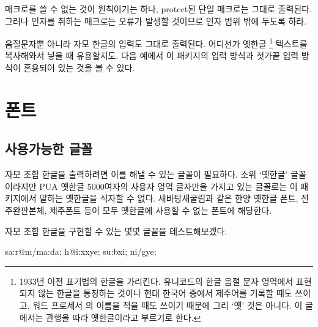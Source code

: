 \documentclass[a4paper]{oblivoir}
\let\cmda\cmd
\begin{document}
\medskip
\begin{exampleside}
\end{exampleside}

매크로를 쓸 수 없는 것이 원칙이기는 하나,
protect된 단일 매크로는 그대로 출력된다. 그러나 인자를 취하는 매크로는 오류가 발생할 것이므로 
인자 범위 밖에 두도록 하라.


\medskip

음절문자뿐 아니라 자모 한글의 입력도 그대로 출력된다. 어디선가 옛한글%
\footnote{1933년 이전 표기법의 한글을 가리킨다.
유니코드의 한글 음절 문자 영역에서 표현되지 않는 한글을 통칭하는 것이나
현대 한국어 중에서 제주어를 기록할 때도 쓰이고, 워드 프로세서 의
이름을 적을 때도 쓰이기 때문에 그리 `옛' 것은 아니다.
이 글에서는 관행을 따라 옛한글이라고 부르기로 한다.}
텍스트를 복사해와서 넣을 때 유용할지도.
다음 예에서 이 패키지의 입력 방식과 첫가끝 입력 방식이 혼용되어 있는 것을 볼 수 있다.

\medskip
\begin{exampleside}
\end{exampleside}

\section{폰트}

\subsection{사용가능한 글꼴}\label{sec:font}

자모 조합 한글을 출력하려면 이를 해낼 수 있는 글꼴이 필요하다. 소위 `옛한글' 글꼴이라지만 PUA 옛한글
5000여자의 사용자 영역 글자만을 가지고 있는 글꼴로는 이 패키지에서 말하는 옛한글을 식자할 수 없다. 새바탕\cntrdot 새굴림과 같은 한양 옛한글
폰트, 전주완판본체, 제주폰트 등이 모두 옛한글에 사용할 수 없는 폰트에 해당한다.

자모 조합 한글을 구현할 수 있는 몇몇 글꼴을 테스트해보겠다. 

\begin{boxedverbatim}
sa:r@m/ma:da; h@i:xxye; su:bxi; ni/gye;
\end{boxedverbatim}
\end{document}

